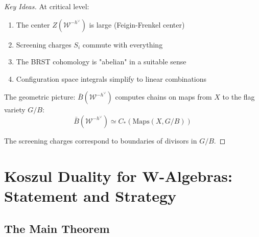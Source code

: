 \begin{proof}[Key Ideas]
At critical level:
\begin{enumerate}
\item The center $Z(\mathcal{W}^{-h^\vee})$ is large (Feigin-Frenkel center)
\item Screening charges $S_i$ commute with everything
\item The BRST cohomology is "abelian" in a suitable sense
\item Configuration space integrals simplify to linear combinations
\end{enumerate}

The geometric picture: $\bar{B}(\mathcal{W}^{-h^\vee})$ computes chains on maps from $X$ to the flag variety $G/B$:
\begin{equation}
\bar{B}(\mathcal{W}^{-h^\vee}) \simeq C_*(\mathrm{Maps}(X, G/B))
\end{equation}

The screening charges correspond to boundaries of divisors in $G/B$.
\end{proof}

\section{Koszul Duality for W-Algebras: Statement and Strategy}

\subsection{The Main Theorem}

